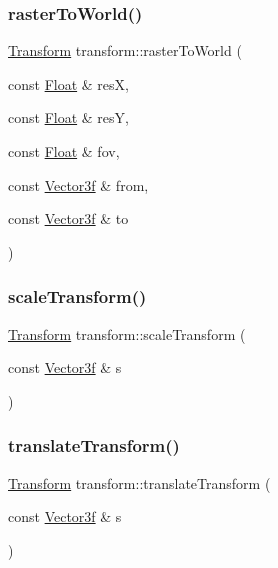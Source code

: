 \subsubsection{\texorpdfstring{rasterToWorld()}{rasterToWorld()}}
{\footnotesize\ttfamily \mbox{\hyperlink{classtransform_1_1Transform}{Transform}} transform\+::raster\+To\+World (\begin{DoxyParamCaption}\item[{const \mbox{\hyperlink{cyclop_8hpp_a07afd7094cb489cbd514c76e6f55d34f}{Float}} \&}]{resX,  }\item[{const \mbox{\hyperlink{cyclop_8hpp_a07afd7094cb489cbd514c76e6f55d34f}{Float}} \&}]{resY,  }\item[{const \mbox{\hyperlink{cyclop_8hpp_a07afd7094cb489cbd514c76e6f55d34f}{Float}} \&}]{fov,  }\item[{const \mbox{\hyperlink{cyclop_8hpp_a5a0a2e85b081623ef3f7e7e8d43024f5}{Vector3f}} \&}]{from,  }\item[{const \mbox{\hyperlink{cyclop_8hpp_a5a0a2e85b081623ef3f7e7e8d43024f5}{Vector3f}} \&}]{to }\end{DoxyParamCaption})}

\mbox{\label{namespacetransform_af72ab6b4dd785c317aa968420703e736}} 
\subsubsection{\texorpdfstring{scaleTransform()}{scaleTransform()}}
{\footnotesize\ttfamily \mbox{\hyperlink{classtransform_1_1Transform}{Transform}} transform\+::scale\+Transform (\begin{DoxyParamCaption}\item[{const \mbox{\hyperlink{cyclop_8hpp_a5a0a2e85b081623ef3f7e7e8d43024f5}{Vector3f}} \&}]{s }\end{DoxyParamCaption})}

\mbox{\label{namespacetransform_aaad998885f4db316ccfc1badca0198f2}} 
\subsubsection{\texorpdfstring{translateTransform()}{translateTransform()}}
{\footnotesize\ttfamily \mbox{\hyperlink{classtransform_1_1Transform}{Transform}} transform\+::translate\+Transform (\begin{DoxyParamCaption}\item[{const \mbox{\hyperlink{cyclop_8hpp_a5a0a2e85b081623ef3f7e7e8d43024f5}{Vector3f}} \&}]{s }\end{DoxyParamCaption})}

